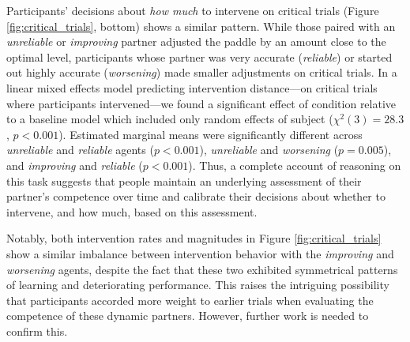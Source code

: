 \documentclass[10pt,letterpaper]{article}
\begin{document}
Participants' decisions about \textit{how much} to intervene on critical trials (Figure \ref{fig:critical_trials}, bottom) shows a similar pattern. While those paired with an \textit{unreliable} or \textit{improving} partner adjusted the paddle by an amount close to the optimal level, participants whose partner was very accurate (\textit{reliable}) or started out highly accurate (\textit{worsening}) made smaller adjustments on critical trials. In a linear mixed effects model predicting intervention distance---on critical trials where participants intervened---we found a significant effect of condition relative to a baseline model which included only random effects of subject ($\chi^2(3) = 28.3$, $p < 0.001$). Estimated marginal means were significantly different across \textit{unreliable} and \textit{reliable} agents ($p < 0.001$), \textit{unreliable} and \textit{worsening} ($p = 0.005$), and \textit{improving} and \textit{reliable} ($p < 0.001$). Thus, a complete account of reasoning on this task suggests that people maintain an underlying assessment of their partner's competence over time and calibrate their decisions about whether to intervene, and how much, based on this assessment.

Notably, both intervention rates and magnitudes in Figure \ref{fig:critical_trials} show a similar imbalance between intervention behavior with the \textit{improving} and \textit{worsening} agents, despite the fact that these two exhibited symmetrical patterns of learning and deteriorating performance. This raises the intriguing possibility that participants accorded more weight to earlier trials when evaluating the competence of these dynamic partners. However, further work is needed to confirm this.
\end{document}

